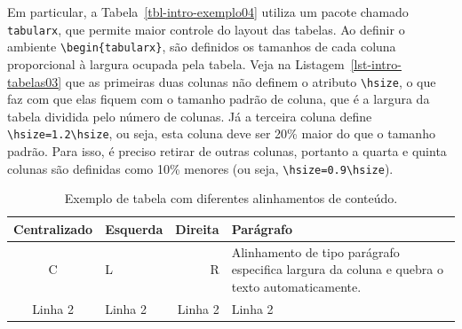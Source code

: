Em particular, a Tabela~\ref{tbl-intro-exemplo04} utiliza um pacote chamado \texttt{tabularx}, que permite maior controle do layout das tabelas. Ao definir o ambiente \texttt{\textbackslash begin\{tabularx\}}, são definidos os tamanhos de cada coluna proporcional à largura ocupada pela tabela. Veja na Listagem~\ref{lst-intro-tabelas03} que as primeiras duas colunas não definem o atributo \texttt{\textbackslash hsize}, o que faz com que elas fiquem com o tamanho padrão de coluna, que é a largura da tabela dividida pelo número de colunas. Já a terceira coluna define \texttt{\textbackslash hsize=1.2\textbackslash hsize}, ou seja, esta coluna deve ser 20\% maior do que o tamanho padrão. Para isso, é preciso retirar de outras colunas, portanto a quarta e quinta colunas são definidas como 10\% menores (ou seja, \texttt{\textbackslash hsize=0.9\textbackslash hsize}).

\begin{table}
	\caption{Exemplo de tabela com diferentes alinhamentos de conteúdo.}
	\label{tbl-intro-exemplo01}
	\centering
	\begin{tabular}{ | c | l | r | p{40mm} |}\hline
		\textbf{Centralizado} & \textbf{Esquerda} & \textbf{Direita} & \textbf{Parágrafo}\\\hline
		C & L & R & Alinhamento de tipo parágrafo especifica largura da coluna e quebra o texto automaticamente.\\
		\hline
		Linha 2 & Linha 2 & Linha 2 & Linha 2\\
		\hline
	\end{tabular}
\end{table}

